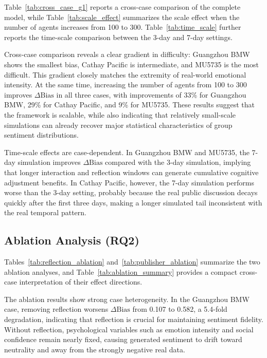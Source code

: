 Table~\ref{tab:cross_case_g1} reports a cross-case comparison of the complete model, while Table~\ref{tab:scale_effect} summarizes the scale effect when the number of agents increases from 100 to 300. Table~\ref{tab:time_scale} further reports the time-scale comparison between the 3-day and 7-day settings.





Cross-case comparison reveals a clear gradient in difficulty: Guangzhou BMW shows the smallest bias, Cathay Pacific is intermediate, and MU5735 is the most difficult. This gradient closely matches the extremity of real-world emotional intensity. At the same time, increasing the number of agents from 100 to 300 improves \(\Delta\mathrm{Bias}\) in all three cases, with improvements of 33\% for Guangzhou BMW, 29\% for Cathay Pacific, and 9\% for MU5735. These results suggest that the framework is scalable, while also indicating that relatively small-scale simulations can already recover major statistical characteristics of group sentiment distributions.

Time-scale effects are case-dependent. In Guangzhou BMW and MU5735, the 7-day simulation improves \(\Delta\mathrm{Bias}\) compared with the 3-day simulation, implying that longer interaction and reflection windows can generate cumulative cognitive adjustment benefits. In Cathay Pacific, however, the 7-day simulation performs worse than the 3-day setting, probably because the real public discussion decays quickly after the first three days, making a longer simulated tail inconsistent with the real temporal pattern.

\subsection{Ablation Analysis (RQ2)}

Tables~\ref{tab:reflection_ablation} and~\ref{tab:publisher_ablation} summarize the two ablation analyses, and Table~\ref{tab:ablation_summary} provides a compact cross-case interpretation of their effect directions.





The ablation results show strong case heterogeneity. In the Guangzhou BMW case, removing reflection worsens \(\Delta\mathrm{Bias}\) from 0.107 to 0.582, a 5.4-fold degradation, indicating that reflection is crucial for maintaining sentiment fidelity. Without reflection, psychological variables such as emotion intensity and social confidence remain nearly fixed, causing generated sentiment to drift toward neutrality and away from the strongly negative real data.

